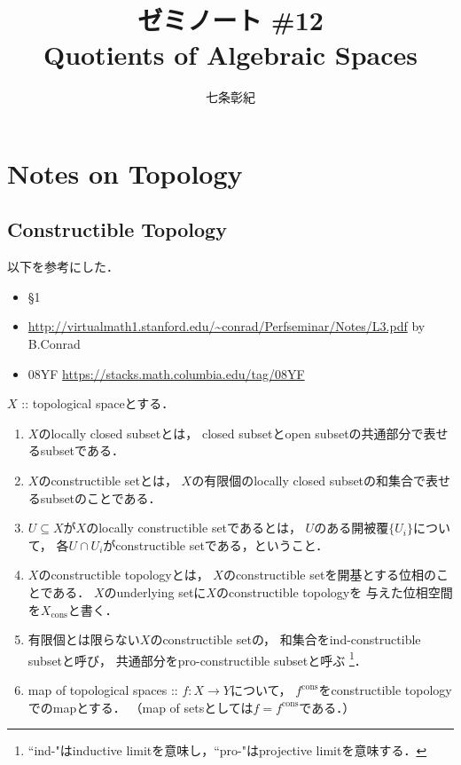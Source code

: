 

\newcommand{\cons}{\mathrm{cons}}
\newcommand{\centerpb}{\ar[lu, phantom, "p.b."]}
\newcommand{\xto}[1]{\xrightarrow{#1}}


\title{ゼミノート \#12 \\ Quotients of Algebraic Spaces}
\author{七条彰紀}
\maketitle
\tableofcontents
\vspace{10pt}

\section{Notes on Topology}
\subsection{Constructible Topology}
以下を参考にした．
\begin{itemize}
    \item \cite{Rydh10} \S1
    \item \url{http://virtualmath1.stanford.edu/~conrad/Perfseminar/Notes/L3.pdf} by B.Conrad
    \item \cite{SP} 08YF \url{https://stacks.math.columbia.edu/tag/08YF}
\end{itemize}

\begin{Def}
    $X$ :: topological spaceとする．
    \begin{enumerate}
    \item 
        $X$のlocally closed subsetとは，
        closed subsetとopen subsetの共通部分で表せるsubsetである．

    \item
        $X$のconstructible setとは，
        $X$の有限個のlocally closed subsetの和集合で表せるsubsetのことである．

    \item
        $U \subseteq X$が$X$のlocally constructible setであるとは，
        $U$のある開被覆$\{U_i\}$について，
        各$U \cap U_i$がconstructible setである，ということ．

    \item
        $X$のconstructible topologyとは，
        $X$のconstructible setを開基とする位相のことである．
        $X$のunderlying setに$X$のconstructible topologyを
        与えた位相空間を$X_{\cons}$と書く．

    \item
        有限個とは限らない$X$のconstructible setの，
        和集合をind-constructible subsetと呼び，
        共通部分をpro-constructible subsetと呼ぶ
        \footnote{ ``ind-"はinductive limitを意味し，``pro-"はprojective limitを意味する． }．

    \item
        map of topological spaces :: $f \colon X \to Y$について，
        $f^{\cons}$をconstructible topologyでのmapとする．
        （map of setsとしては$f=f^{\cons}$である．）
    \end{enumerate}
\end{Def}

